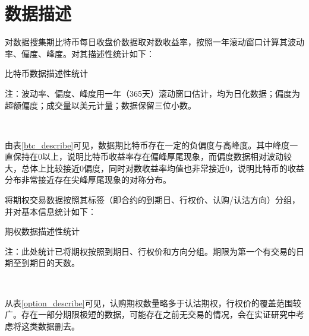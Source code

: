 \section{数据描述}
    \par{
        对数据搜集期比特币每日收盘价数据取对数收益率，按照一年滚动窗口计算其波动率、偏度、峰度。对其描述性统计如下：}

        \begin{threeparttable}[H]
            
            \centering
            \caption{比特币数据描述性统计}
            \label{btc_describe}
            
            \begin{tablenotes}
                \footnotesize
                \item 注：波动率、偏度、峰度用一年（365天）滚动窗口估计，均为日化数据；偏度为超额偏度；成交量以美元计量；数据保留三位小数。
            \end{tablenotes}
        \end{threeparttable}
        
    
    ~\\
    \par{
        
        由表\ref{btc_describe}可见，数据期比特币存在一定的负偏度与高峰度。其中峰度一直保持在0以上，说明比特币收益率存在偏峰厚尾现象，而偏度数据相对波动较大，总体上比较接近0偏度，同时对数收益率均值也非常接近0，说明比特币的收益分布非常接近存在尖峰厚尾现象的对称分布。
    }
    \newpage
    \par{
        将期权交易数据按照其标签（即合约的到期日、行权价、认购/认沽方向）分组，并对基本信息统计如下：
    }
    \par{
    \begin{threeparttable}[H]
        \centering
        \caption{期权数据描述性统计}
        \label{option_describe}
        
        \begin{tablenotes}
            \footnotesize
            \item 注：此处统计已将期权按照到期日、行权价和方向分组。期限为第一个有交易的日期至到期日的天数。
        \end{tablenotes}
    \end{threeparttable}
    }
    ~\\
    \par{
    从表\ref{option_describe}可见，认购期权数量略多于认沽期权，行权价的覆盖范围较广。存在一部分期限极短的数据，可能存在之前无交易的情况，会在实证研究中考虑将这类数据删去。
    }